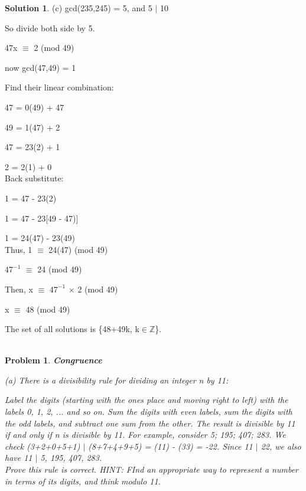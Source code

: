 \documentclass{article}
\newtheorem{problem}{Problem}
\theoremstyle{definition}
\newtheorem*{solution}{Solution}
\begin{document}
\begin{solution}
(c) gcd(235,245) = 5, and 5 \(|\) 10

So divide both side by 5.

47x \(\equiv\) 2 (mod 49)

now gcd(47,49) = 1

Find their linear combination:

47 = 0(49) + 47

49 = 1(47) + 2

47 = 23(2) + 1 

2 = 2(1) + 0\\

Back substitute:

1 = 47 - 23(2)

1 = 47 - 23[49 - 47)]

1 = 24(47) - 23(49)\\

Thus, 1 \(\equiv\) 24(47) (mod 49)

\(47^{-1}\) \(\equiv\) 24 (mod 49)

Then, x \(\equiv\) \(47^{-1}\) \(\times\) 2 (mod 49)

x \(\equiv\) 48 (mod 49)

The set of all solutions is \{48+49k, k\(\in\)\(\mathbb{Z}\)\}.\\\\


\end{solution}



\begin{problem}

\textbf{Congruence}

(a) There is a divisibility rule for dividing an integer n by 11:

Label the digits (starting with the ones place and moving right to left) with the labels 0, 1, 2, ... and so on. Sum the digits with even labels, sum the digits with the odd labels, and subtract one sum from the other. The result is divisible by 11 if and only if n is divisible by 11. For example, consider 5; 195; 407; 283. We check (3+2+0+5+1) \(|\) (8+7+4+9+5) =
(11) - (33) = -22. Since 11 \(|\) 22, we also have 11 \(|\) 5, 195, 407, 283.\\

Prove this rule is correct. HINT: FInd an appropriate way to represent a number in terms of its digits, and think modulo 11.\\\\

\end{problem}
\end{document}
